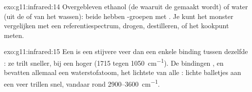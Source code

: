 \begin{solution}{exo:g11:infrared:14}
Overgebleven ethanol (de  waaruit de  gemaakt wordt) of water
(uit de  of van het wassen): beide hebben -groepen met
. Je kunt het monster vergelijken met een
referentiespectrum, drogen, destilleren, of het kookpunt meten.
\end{solution}

\begin{solution}{exo:g11:infrared:15}
Een  is een stijvere veer dan een enkele binding tussen
dezelfde : ze trilt sneller, bij een hoger  (1715 tegen
\qty{1050}{cm^{-1}}). De bindingen ,  en  bevatten
allemaal een waterstofatoom, het lichtste van alle : lichte
balletjes aan een veer trillen snel, vandaar  rond
2900--\qty{3600}{cm^{-1}}.
\end{solution}

